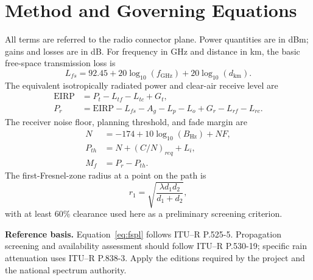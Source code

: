 \section{Method and Governing Equations}

All terms are referred to the radio connector plane.  Power quantities are in dBm;
gains and losses are in dB.  For frequency in GHz and distance in km, the basic
free-space transmission loss is
\begin{equation}
  L_{fs}=92.45+20\log_{10}(f_{\mathrm{GHz}})
               +20\log_{10}(d_{\mathrm{km}}).
  \label{eq:fspl}
\end{equation}
The equivalent isotropically radiated power and clear-air receive level are
\begin{align}
  \mathrm{EIRP} &= P_t-L_{tf}-L_{tc}+G_t, \\
  P_r &= \mathrm{EIRP}-L_{fs}-A_g-L_p-L_o+G_r-L_{rf}-L_{rc}.
  \label{eq:pr}
\end{align}
The receiver noise floor, planning threshold, and fade margin are
\begin{align}
  N &= -174+10\log_{10}(B_{\mathrm{Hz}})+NF, \\
  P_{th} &= N+(C/N)_{req}+L_i, \\
  M_f &= P_r-P_{th}.
  \label{eq:margin}
\end{align}
The first-Fresnel-zone radius at a point on the path is
\begin{equation}
  r_1=\sqrt{\frac{\lambda d_1d_2}{d_1+d_2}},
\end{equation}
with at least 60\% clearance used here as a preliminary screening criterion.

\begin{summarybox}
\textbf{Reference basis.} Equation~\eqref{eq:fspl} follows ITU--R P.525-5.
Propagation screening and availability assessment should follow ITU--R P.530-19;
specific rain attenuation uses ITU--R P.838-3.  Apply the editions required by the
project and the national spectrum authority.
\end{summarybox}
